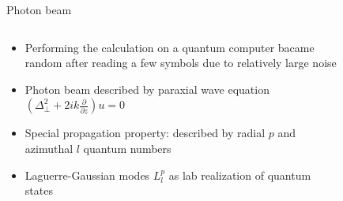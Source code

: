 \documentclass[aspectratio=169,9pt]{beamer}
\begin{document}
\begin{frame}[t]{Photon beam}
  \begin{columns}[T]
    \begin{column}[]{0.45\textwidth}
      \begin{itemize}
        \item Performing the calculation on a quantum computer bacame random after reading a few symbols due to relatively large noise
        \vspace*{1em}
        \item Photon beam described by paraxial wave equation $\left(\Delta_\perp^2+2ik\frac{\partial}{\partial z}\right)u=0$
        \item Special propagation property: described by radial $p$ and azimuthal $l$ quantum numbers
        \item Laguerre-Gaussian modes $L^p_l$ as lab realization of quantum states
      \end{itemize}
    \end{column}
    \begin{column}[]{0.05\textwidth}
    \end{column}
    \begin{column}[]{0.45\textwidth}
      \vspace*{-5em}
      \begin{figure}

\end{figure}
\end{column}
\end{columns}
\end{frame}
\end{document}
